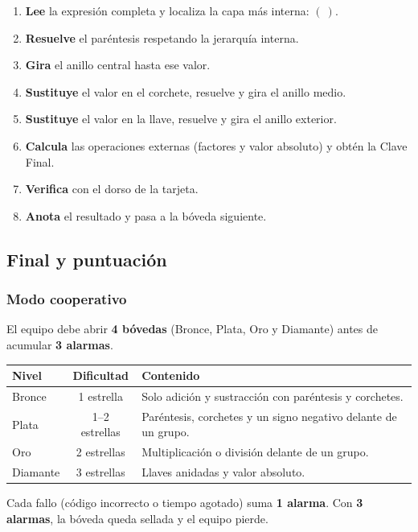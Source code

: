 \documentclass[12pt, letterpaper]{article}
\begin{document}
\begin{enumerate}[leftmargin=*]
  \item \textbf{Lee} la expresión completa y localiza la capa más interna: $(~)$.
  \item \textbf{Resuelve} el paréntesis respetando la jerarquía interna.
  \item \textbf{Gira} el anillo central hasta ese valor.
  \item \textbf{Sustituye} el valor en el corchete, resuelve y gira el anillo medio.
  \item \textbf{Sustituye} el valor en la llave, resuelve y gira el anillo exterior.
  \item \textbf{Calcula} las operaciones externas (factores y valor absoluto) y obtén la Clave Final.
  \item \textbf{Verifica} con el dorso de la tarjeta.
  \item \textbf{Anota} el resultado y pasa a la bóveda siguiente.
\end{enumerate}

\subsection{Final y puntuación}

\subsubsection{Modo cooperativo}

El equipo debe abrir \textbf{4 bóvedas} (Bronce, Plata, Oro y Diamante) antes de acumular \textbf{3 alarmas}.

\begin{center}
\small
\begin{tabular}{@{}l c p{9cm}@{}}
\toprule
\textbf{Nivel} & \textbf{Dificultad} & \textbf{Contenido}\\
\midrule
Bronce & 1 estrella & Solo adición y sustracción con paréntesis y corchetes.\\
Plata & 1--2 estrellas & Paréntesis, corchetes y un signo negativo delante de un grupo.\\
Oro & 2 estrellas & Multiplicación o división delante de un grupo.\\
Diamante & 3 estrellas & Llaves anidadas y valor absoluto.\\
\bottomrule
\end{tabular}
\end{center}

Cada fallo (código incorrecto o tiempo agotado) suma \textbf{1 alarma}. Con \textbf{3 alarmas}, la bóveda queda sellada y el equipo pierde.
\end{document}
